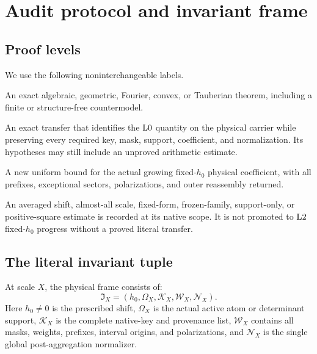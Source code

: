 \section{Audit protocol and invariant frame}
\label{sec:audit-protocol}

\subsection{Proof levels}

\begin{definition}
\label{def:proof-levels}
We use the following noninterchangeable labels.
\begin{description}[leftmargin=2.5em,style=nextline]
\item[\(\Lzero\): finite model or abstract theorem.]
An exact algebraic, geometric, Fourier, convex, or Tauberian theorem,
including a finite or structure-free countermodel.

\item[\(\Lone\): literal interface theorem.]
An exact transfer that identifies the \(\Lzero\) quantity on the
physical carrier while preserving every required key, mask, support,
coefficient, and normalization.  Its hypotheses may still include an
unproved arithmetic estimate.

\item[\(\Ltwo\): growing arithmetic estimate.]
A new uniform bound for the actual growing fixed-\(h_0\) physical
coefficient, with all prefixes, exceptional sectors, polarizations,
and outer reassembly returned.
\end{description}
\end{definition}

\begin{remark}
An averaged shift, almost-all scale, fixed-form, frozen-family,
support-only, or positive-square estimate is recorded at its native
scope.  It is not promoted to \(\Ltwo\) fixed-\(h_0\) progress without
a proved literal transfer.
\end{remark}

\subsection{The literal invariant tuple}

\begin{definition}
\label{def:literal-frame}
At scale \(X\), the physical frame consists of:
\[
 \mathfrak I_X=
 (h_0,\Omega_X,\mathcal K_X,\mathcal W_X,\mathcal N_X).
\]
Here \(h_0\ne0\) is the prescribed shift, \(\Omega_X\) is the actual
active atom or determinant support, \(\mathcal K_X\) is the complete
native-key and provenance list, \(\mathcal W_X\) contains all masks,
weights, prefixes, interval origins, and polarizations, and
\(\mathcal N_X\) is the single global post-aggregation normalizer.
\end{definition}

